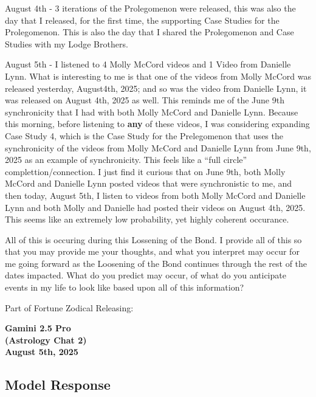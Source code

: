 \documentclass{article}
\begin{document}
August 4th - 3 iterations of the Prolegomenon were released, this was also the day that I released, for the first time, the supporting Case Studies for the Prolegomenon. This is also the day that I shared the Prolegomenon and Case Studies with my Lodge Brothers.

August 5th - I listened to 4 Molly McCord videos and 1 Video from Danielle Lynn. What is interesting to me is that one of the videos from Molly McCord was released yesterday, August4th, 2025; and so was the video from Danielle Lynn, it was released on August 4th, 2025 as well. This reminds me of the June 9th synchronicity that I had with both Molly McCord and Danielle Lynn. Because this morning, before listening to \textbf{any} of these videos, I was considering expanding Case Study 4, which is the Case Study for the Prelegomenon that uses the synchronicity of the videos from Molly McCord and Danielle Lynn from June 9th, 2025 as an example of synchronicity. This feels like a ``full circle'' complettion/connection. I just find it curious that on June 9th, both Molly McCord and Danielle Lynn posted videos that were synchronistic to me, and then today, August 5th, I listen to videos from both Molly McCord and Danielle Lynn and both Molly and Danielle had posted their videos on August 4th, 2025. This seems like an extremely low probability, yet highly coherent occurance.

All of this is occuring during this Lossening of the Bond. I provide all of this so that you may provide me your thoughts, and what you interpret may occur for me going forward as the Loosening of the Bond continues through the rest of the dates impacted. What do you predict may occur, of what do you anticipate events in my life to look like based upon all of this information?

Part of Fortune Zodical Releasing:


\begin{center}
\textbf{Gamini 2.5 Pro} \\
\textbf{(Astrology Chat 2)} \\
\textbf{August 5th, 2025}
\end{center}

\subsection*{Model Response}\label{model-response}
\end{document}
